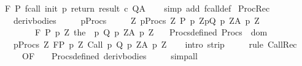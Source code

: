 \begin{isabellebody}
{\isasymLongrightarrow}\ {\isasymGamma}{\isacharcomma}{\isasymTheta}{\isasymturnstile}\isactrlbsub {\isacharslash}F\isactrlesub \ P\ {\isacharparenleft}fcall\ init\ p\ return\ result\ c{\isacharparenright}\ Q{\isacharcomma}A{\isachardoublequoteclose}\isanewline
%
\isadelimproof
\ \ %
\endisadelimproof
%
\isatagproof
{}\isamarkupfalse%
\ {\isacharparenleft}simp\ add{\isacharcolon}\ fcall{\isacharunderscore}def{\isacharparenright}%
\endisatagproof
{\isafoldproof}%
%
\isadelimproof
\isanewline
%
\endisadelimproof
\isanewline
\isanewline
{}\isamarkupfalse%
\ ProcRec{\isacharcolon}\isanewline
\ \ \ deriv{\isacharunderscore}bodies{\isacharcolon}\ \ \isanewline
\ \ \ {\isachardoublequoteopen}{\isasymforall}p{\isasymin}Procs{\isachardot}\ \isanewline
\ \ \ \ {\isasymforall}Z{\isachardot}\ {\isasymGamma}{\isacharcomma}{\isasymTheta}{\isasymunion}{\isacharparenleft}{\isasymUnion}p{\isasymin}Procs{\isachardot}\ {\isasymUnion}Z{\isachardot}\ {\isacharbraceleft}{\isacharparenleft}P\ p\ Z{\isacharcomma}p{\isacharcomma}Q\ p\ Z{\isacharcomma}A\ p\ Z{\isacharparenright}{\isacharbraceright}{\isacharparenright}\isanewline
\ \ \ \ \ \ \ \ {\isasymturnstile}\isactrlbsub {\isacharslash}F\isactrlesub \ {\isacharparenleft}P\ p\ Z{\isacharparenright}\ {\isacharparenleft}the\ {\isacharparenleft}{\isasymGamma}\ p{\isacharparenright}{\isacharparenright}\ {\isacharparenleft}Q\ p\ Z{\isacharparenright}{\isacharcomma}{\isacharparenleft}A\ p\ Z{\isacharparenright}{\isachardoublequoteclose}\isanewline
\ \ \ Procs{\isacharunderscore}defined{\isacharcolon}\ {\isachardoublequoteopen}Procs\ {\isasymsubseteq}\ dom\ {\isasymGamma}{\isachardoublequoteclose}\isanewline
\ \ \ {\isachardoublequoteopen}{\isasymforall}p{\isasymin}Procs{\isachardot}\ {\isasymforall}Z{\isachardot}\ {\isasymGamma}{\isacharcomma}{\isasymTheta}{\isasymturnstile}\isactrlbsub {\isacharslash}F\isactrlesub {\isacharparenleft}P\ p\ Z{\isacharparenright}\ Call\ p\ {\isacharparenleft}Q\ p\ Z{\isacharparenright}{\isacharcomma}{\isacharparenleft}A\ p\ Z{\isacharparenright}{\isachardoublequoteclose}\isanewline
%
\isadelimproof
\ \ %
\endisadelimproof
%
\isatagproof
{}\isamarkupfalse%
\ {\isacharparenleft}intro\ strip{\isacharparenright}\isanewline
\ \ \ \ \ {\isacharparenleft}rule\ CallRec{\isacharprime}\ \isanewline
\ \ \ \ \ {\isacharbrackleft}OF\ {\isacharunderscore}\ \ \ Procs{\isacharunderscore}defined\ deriv{\isacharunderscore}bodies{\isacharbrackright}{\isacharcomma}\isanewline
\ \ \ \ \ simp{\isacharunderscore}all{\isacharparenright}%

\end{isabellebody}
